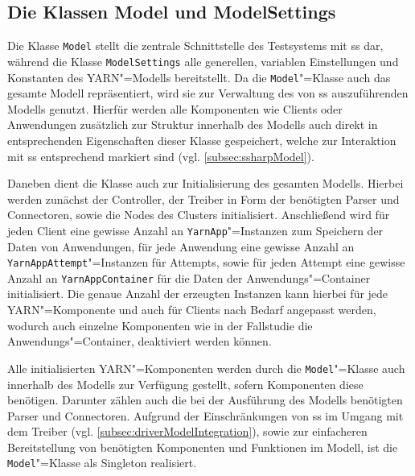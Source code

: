 \subsection{Die Klassen Model und ModelSettings}
\label{subsec:modelClass}

Die Klasse \texttt{Model} stellt die zentrale Schnittstelle des Testsystems mit \ac{ss} dar, während die Klasse \texttt{ModelSettings} alle generellen, variablen Einstellungen und Konstanten des \ac{YARN}"=Modells bereitstellt.
Da die \texttt{Model}"=Klasse auch das gesamte Modell repräsentiert, wird sie zur Verwaltung des von \ac{ss} auszuführenden Modells genutzt.
Hierfür werden alle Komponenten wie Clients oder Anwendungen zusätzlich zur Struktur innerhalb des Modells auch direkt in entsprechenden Eigenschaften dieser Klasse gespeichert, welche zur Interaktion mit \ac{ss} entsprechend markiert sind (vgl. \cref{subsec:ssharpModel}).

Daneben dient die Klasse auch zur Initialisierung des gesamten Modells.
Hierbei werden zunächst der Controller, der Treiber in Form der benötigten Parser und Connectoren, sowie die Nodes des Clusters initialisiert.
Anschließend wird für jeden Client eine gewisse Anzahl an \texttt{YarnApp}"=Instanzen zum Speichern der Daten von Anwendungen, für jede Anwendung eine gewisse Anzahl an \texttt{YarnAppAttempt}"=Instanzen für Attempts, sowie für jeden Attempt eine gewisse Anzahl an \texttt{YarnAppContainer} für die Daten der Anwendungs"=Container initialisiert.
Die genaue Anzahl der erzeugten Instanzen kann hierbei für jede \ac{YARN}"=Komponente und auch für Clients nach Bedarf angepasst werden, wodurch auch einzelne Komponenten wie \zB in der Fallstudie die Anwendungs"=Container, deaktiviert werden können.

Alle initialisierten \ac{YARN}"=Komponenten werden durch die \texttt{Model}"=Klasse auch innerhalb des Modells zur Verfügung gestellt, sofern Komponenten diese benötigen.
Darunter zählen auch die bei der Ausführung des Modells benötigten Parser und Connectoren.
Aufgrund der Einschränkungen von \ac{ss} im Umgang mit dem Treiber (vgl. \cref{subsec:driverModelIntegration}), sowie zur einfacheren Bereitstellung von benötigten Komponenten und Funktionen im Modell, ist die \texttt{Model}"=Klasse als Singleton realisiert.

